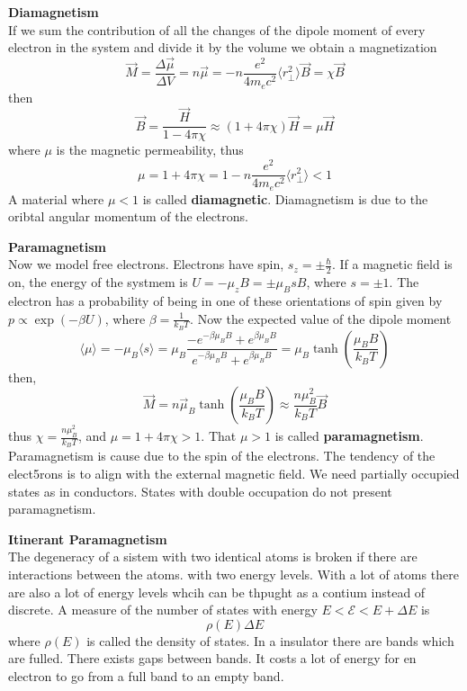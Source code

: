 \documentclass[12pt,a4paper]{article}
\begin{document}
\textbf{Diamagnetism}\\
If we sum the contribution of all the changes of the dipole moment of every electron in the system and divide it by the volume we obtain a magnetization
\begin{equation}
	\vec{M} = \frac{\Delta \vec{\mu}}{\Delta V} = n\vec{\mu} = -n\frac{e^2}{4m_e c^2} \langle r_{\perp}^2 \rangle \vec{B} = \chi \vec{B}
\end{equation}
then
\begin{equation}
	\vec{B} = \frac{\vec{H}}{1-4\pi\chi} \approx (1+4\pi\chi)\vec{H} = \mu \vec{H} 
\end{equation}
where $ \mu$ is the magnetic permeability, thus
\begin{equation}
	\mu =1 + 4\pi\chi = 1 -n\frac{e^2}{4m_e c^2} \langle r_{\perp}^2 \rangle < 1
\end{equation}
A material where $\mu < 1$ is called \textbf{diamagnetic}. Diamagnetism is due to the oribtal angular momentum of the electrons.

\textbf{Paramagnetism}\\
Now we model free electrons. Electrons have spin, $s_z = \pm \frac{\hbar}{2}$. If a magnetic field is on, the energy of the systmem is $U = -\mu_z B =\pm\mu_B s B $, where $s = \pm 1$. The electron has a probability of being in one of these orientations of spin given by $p \propto \exp (-\beta U)$, where $\beta = \frac{1}{k_B T}$. Now the expected value of the dipole moment
\begin{equation}
	\langle \mu \rangle = -\mu_B \langle s \rangle =\mu_B \frac{-e^{-\beta \mu_B B} + e^{\beta \mu_B B}}{e^{-\beta \mu_B B} + e^{\beta \mu_B B}} = \mu_B\tanh\left( \frac{\mu_B B}{k_B T}\right)
\end{equation}
then,
\begin{equation}
	\vec{M} = n\vec{\mu}_B \tanh \left( \frac{\mu_B B}{k_B T}\right) \approx  \frac{n\mu_B^2}{k_B T} \vec{B}
\end{equation}
thus $\chi = \frac{n \mu_B^2}{k_B T}$, and $\mu = 1 + 4\pi \chi > 1$. That $\mu > 1$ is called \textbf{paramagnetism}. Paramagnetism is cause due to the spin of the electrons. The tendency of the elect5rons is to align with the external magnetic field. We need partially occupied states as in conductors. States with double occupation do not present paramagnetism.

\textbf{Itinerant Paramagnetism}\\
The degeneracy of a sistem with two identical atoms is broken if there are interactions between the atoms. with two energy levels. With a lot of atoms there are also a lot of energy levels whcih can be thpught as  a contium instead of discrete. A measure of the number of states with energy $E < \mathcal{E} <E + \Delta E$ is 
	\begin{equation}
		\rho(E) \Delta E
	\end{equation}
where $\rho(E)$ is called the density of states.
In a insulator there are bands which are fulled. There exists gaps between bands. It costs a lot of energy for en electron to go from a full band to an empty band.
\end{document}
